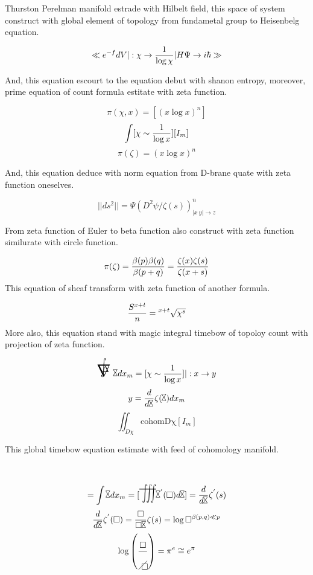 \documentclass{jsarticle}
\begin{document}
  \newcommand{\whitewithboder}{%
	  \begin{picture}(15,30)
		  \put(0,0){\scalebox{2.0}[2]{$\square$}}
		  \put(4,4){$\square$}
	  \end{picture}%
  } 
  \newcommand{\whitewithnabla}{%
	  \begin{picture}(15,30)
		  \put(0,0){\scalebox{2.0}[2]{$\nabla$}}
		  \put(3,3){$\nabla$}
	  \end{picture}%
  } 




  Thurston Perelman manifold estrade with Hilbelt field,
  this space of system construct with global element of topology
  from fundametal group to Heisenbelg equation.

 $$ \ll e^{-f}dV | : \chi \to {1 \over {\log \chi}} | H\Psi \to i\hbar\gg $$

  And, this equation escourt to the equation debut with shanon entropy,
  moreover, prime equation of count formula estitate with zeta function.

 $$ \pi(\chi,x) = [(x\log x)^{n}] $$
 $$ \int [\chi \sim {1 \over {\log x}}][I_m] $$
 $$ \pi(\zeta) = (x\log x)^{n} $$

 And, this equation deduce with norm equation from D-brane quate with
 zeta function oneselves.


 $$ ||ds^2|| = \Psi\left(D^{2}\psi / \zeta(s)\right)^{n}_{|x \ y|
 \to z} $$

 From zeta function of Euler to beta function also construct with
 zeta function similurate with circle function.

 
 $$ \pi(\zeta) = {\beta(p)\beta(q) \over {\beta(p+q)}}
 = {\zeta(x)\zeta(s) \over {\zeta(x+s)}} $$
 This equation of sheaf transform with zeta function of another formula.


 $$ {S^{x+t} \over n} ={}^{x+t}\sqrt{\chi^{s}} $$
 More also, this equation stand with magic integral timebow of topoloy
 count with projection of zeta function.


 $$\magicint \timebow dx_m = [\chi \sim {1 \over {\log x}}]|: x \to y  $$
 $$ y = {d \over {d \timebow}}\zeta(\timebow)dx_m $$
 $$ \iint_{D\chi} \mathrm{cohom D\chi}[I_m] $$

 This global timebow equation estimate with feed of cohomology manifold.


 $$ = \int \timebow dx_m = [\scalebox{1}[2]{$\variiint$} \timebow^{'}(\square)d\timebow]
 = {d \over {d \timebow}}\zeta^{'}(s) $$
 $$ {d \over {d \timebow}}\zeta^{'}(\square) = {\square \over {\square
 \timebow}}\zeta(s) = \log \square^{\beta(p,q) \ll p} $$
 $$ \log\left(\square \over \alearletter\right) = \pi^{e} \cong e^{\pi} $$
\end{document}
